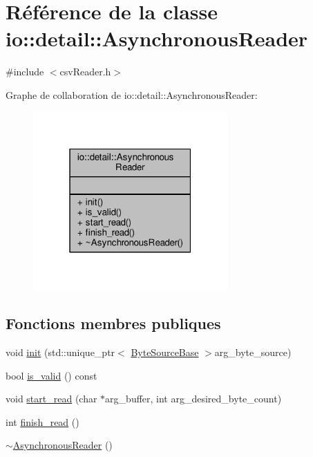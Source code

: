\hypertarget{classio_1_1detail_1_1AsynchronousReader}{}\section{Référence de la classe io\+:\+:detail\+:\+:Asynchronous\+Reader}
\label{classio_1_1detail_1_1AsynchronousReader}


{\ttfamily \#include $<$csv\+Reader.\+h$>$}



Graphe de collaboration de io\+:\+:detail\+:\+:Asynchronous\+Reader\+:
\nopagebreak
\begin{figure}[H]
\begin{center}
\leavevmode
\includegraphics[width=211pt]{classio_1_1detail_1_1AsynchronousReader__coll__graph}
\end{center}
\end{figure}
\subsection*{Fonctions membres publiques}
\begin{DoxyCompactItemize}
\item 
void \hyperlink{classio_1_1detail_1_1AsynchronousReader_a12ed45f881a671b473d95ded7ad1474c}{init} (std\+::unique\+\_\+ptr$<$ \hyperlink{classio_1_1ByteSourceBase}{Byte\+Source\+Base} $>$arg\+\_\+byte\+\_\+source)
\item 
bool \hyperlink{classio_1_1detail_1_1AsynchronousReader_ab6b6f8483008208fc3f529f94c7125e2}{is\+\_\+valid} () const
\item 
void \hyperlink{classio_1_1detail_1_1AsynchronousReader_a9818851dbb994042d0d84183220e71c6}{start\+\_\+read} (char $\ast$arg\+\_\+buffer, int arg\+\_\+desired\+\_\+byte\+\_\+count)
\item 
int \hyperlink{classio_1_1detail_1_1AsynchronousReader_a94520530423e9bfeb04c23ea4e3a8786}{finish\+\_\+read} ()
\item 
\hyperlink{classio_1_1detail_1_1AsynchronousReader_a284dd807219eb954c35de4379822c02b}{$\sim$\+Asynchronous\+Reader} ()
\end{DoxyCompactItemize}


